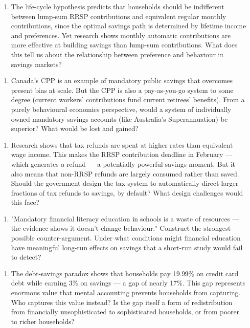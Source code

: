 \documentclass[12pt, letterpaper]{article}
\begin{document}
\begin{enumerate}
\item The life-cycle hypothesis predicts that households should be indifferent between lump-sum RRSP contributions and equivalent regular monthly contributions, since the optimal savings path is determined by lifetime income and preferences. Yet research shows monthly automatic contributions are more effective at building savings than lump-sum contributions. What does this tell us about the relationship between preference and behaviour in savings markets?
\end{enumerate}

\begin{enumerate}
\item Canada's CPP is an example of mandatory public savings that overcomes present bias at scale. But the CPP is also a pay-as-you-go system to some degree (current workers' contributions fund current retirees' benefits). From a purely behavioural economics perspective, would a system of individually owned mandatory savings accounts (like Australia's Superannuation) be superior? What would be lost and gained?
\end{enumerate}

\begin{enumerate}
\item Research shows that tax refunds are spent at higher rates than equivalent wage income. This makes the RRSP contribution deadline in February --- which generates a refund --- a potentially powerful savings moment. But it also means that non-RRSP refunds are largely consumed rather than saved. Should the government design the tax system to automatically direct larger fractions of tax refunds to savings, by default? What design challenges would this face?
\end{enumerate}

\begin{enumerate}
\item "Mandatory financial literacy education in schools is a waste of resources --- the evidence shows it doesn't change behaviour." Construct the strongest possible counter-argument. Under what conditions might financial education have meaningful long-run effects on savings that a short-run study would fail to detect?
\end{enumerate}

\begin{enumerate}
\item The debt-savings paradox shows that households pay 19.99\% on credit card debt while earning 3\% on savings --- a gap of nearly 17\%. This gap represents enormous value that mental accounting prevents households from capturing. Who captures this value instead? Is the gap itself a form of redistribution from financially unsophisticated to sophisticated households, or from poorer to richer households?
\end{enumerate}
\end{document}
